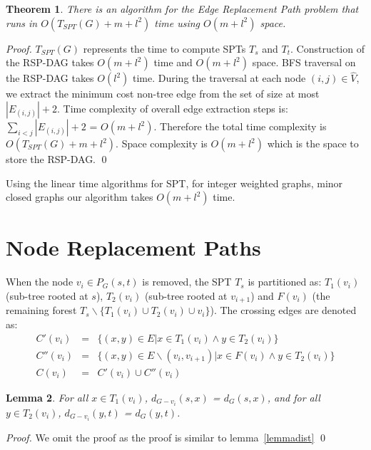 \documentclass[11pt,a4paper]{llncs}
\newtheorem{thm}{Theorem}
\newtheorem{lem}[thm]{Lemma}
\begin{document}
\begin{thm}
\label{thm2}
There is an algorithm for
the Edge Replacement Path problem that runs in $O(T_{SPT}(G)+ m + l^2)$ time using $O(m + l^2)$ space.
\end{thm}

\begin{proof}
$T_{SPT}(G)$ represents the time to compute SPTs $T_{s}$ and $T_{t}$.
Construction of the RSP-DAG takes $O(m + l^2)$ time and $O(m + l^2)$ space. BFS traversal on the RSP-DAG
takes $O(l^2)$ time. During the traversal at each node $(i,j) \in \widehat{V}$, we
extract the minimum cost non-tree edge from the set of size at most $|E_{(i,j)}| + 2$.
Time complexity of overall edge extraction steps is:
$\sum_{i<j}|E_{(i,j)}| + 2$ = $O(m + l^2)$. Therefore the total time complexity is $O(T_{SPT}(G)+ m + l^2)$.
Space complexity is $O(m + l^2)$ which is the space to store the RSP-DAG.
\qed
\end{proof}

Using the linear time algorithms for SPT, for integer weighted graphs,
minor closed graphs our algorithm takes $O(m + l^2)$ time.

\section{Node Replacement Paths}
\label{nrsp}
When the node $v_{i} \in P_{G}(s,t)$ is removed,
the SPT $T_{s}$ is partitioned as:
$T_{1}(v_{i})$ (sub-tree rooted at $s$), $T_{2}(v_{i})$ (sub-tree rooted at $v_{i+1}$) and
$F(v_{i})$ (the remaining forest $T_{s} \backslash \{T_{1}(v_{i}) \cup T_{2}(v_{i}) \cup {v_{i}}\}$).
The crossing edges are denoted as:
\begin{eqnarray}
C'(v_{i}) &=&  \{ (x, y) \in E | x \in T_{1}(v_{i}) \wedge y \in T_{2}(v_{i}) \}  \\
  C''(v_{i}) &=&  \{ (x, y) \in E \backslash (v_{i}, v_{i+1})| x \in F(v_{i}) \wedge y \in T_{2}(v_{i}) \} \\
  C(v_{i}) &=&  C'(v_{i}) \cup C''(v_{i})
\end{eqnarray}

\begin{lem}
\label{lemmadistvrp}
For all $x \in T_{1}(v_{i})$, $d_{G-{v_{i}}}(s,x)$ = $d_{G}(s,x)$, and for all $y \in T_{2}(v_{i})$, $d_{G-{v_{i}}}(y,t)$ = $d_{G}(y,t)$.
\end{lem}

\begin{proof}
\begin{comment}
As $x \in T_{1}(v_{i})$, the shortest $s-x$ path is fully in $T_{1}(v_{i})$ and does not include
the vertex $v_{i}$. Hence, $d_{G-{v_{i}}}(s,x)$ = $d_{G}(s,x)$.

To prove $d_{G-{v_{i}}}(y,t) = d_{G}(y,t)$, for the sake of contradiction,
let us assume that $d_{G-{v_{i}}}(y,t) \neq d_{G}(y,t)$. It means that,
$P_{G}(y,t)$ uses the vertex $v_{i}$. This implies that, $d_{G}(v_{i+1}, y) > d_{G}(v_{i}, y)$.
Since $y \in T_{2}(v_{i})$, $d_{G}(v_{i}, y) > d_{G}(v_{i+1}, y)$ a contradiction.
Hence, $d_{G-{v_{i}}}(y,t) = d_{G}(y,t)$.
\end{comment}
We omit the proof as the proof is similar to lemma~\ref{lemmadist}
\qed
\end{proof}
\end{document}
